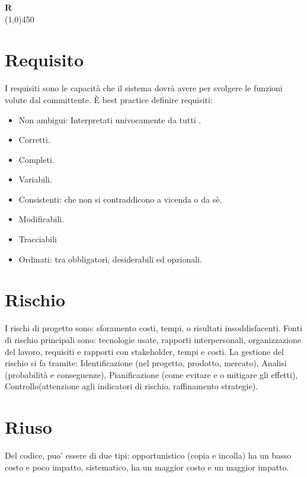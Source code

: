 		\newpage

	{\Huge{\textbf{R}}} \\
	\line(1,0){450}

	\section{Requisito}
	\label{sec:requisito}
	I requisiti sono le capacità che il sistema dovrà avere per svolgere le funzioni volute dal committente. È best practice definire requisiti:
	\begin{itemize}  
	\item Non ambigui: Interpretati univocamente da tutti .
	\item Corretti.
	\item Completi.
	\item Variabili.
	\item Consistenti: che non si contraddicono a vicenda o da sè.
	\item Modificabili.
	\item Tracciabili
	\item Ordinati: tra obbligatori, desiderabili ed opzionali. 
	\end{itemize}

	\section{Rischio}
	\label{sec:rischio}
	I rischi di progetto sono: sforamento costi, tempi, o risultati insoddisfacenti. Fonti di rischio principali sono:
	tecnologie usate, rapporti interpersonali, organizzazione del lavoro, requisiti e rapporti con stakeholder, tempi e costi.
	La gestione del rischio si fa tramite:
	Identificazione (nel progetto, prodotto, mercato), Analisi (probabilità e conseguenze), Pianificazione (come evitare e o mitigare gli effetti), Controllo(attenzione agli indicatori di rischio, raffinamento strategie).
	
	\section{Riuso}
	\label{sec:riuso}
	Del codice, puo' essere di due tipi: opportunistico (copia e incolla) ha un basso costo e poco impatto, sistematico, ha un maggior costo e un maggior impatto.		

